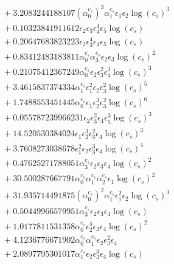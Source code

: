 \documentclass[10pt]{article}
\begin{document}
\begin{align*}
&{}  + 3.2083244188107 \left(\alpha_{0}^{c_s}\right)^{3} \alpha_{1}^{c_s} \epsilon_{1} \epsilon_{2} \log{\left(c_{s} \right)}^{3} \\
&{}  + 0.10323841911612 \epsilon_{2} \epsilon_{3} \epsilon_{4}^{4} \epsilon_{5} \log{\left(c_{s} \right)} \\
&{}  + 0.20647683823223 \epsilon_{2} \epsilon_{3}^{4} \epsilon_{4} \epsilon_{5} \log{\left(c_{s} \right)} \\
&{}  + 0.83412483183811 \alpha_{0}^{c_s} \alpha_{3}^{c_s} \epsilon_{2} \epsilon_{3} \log{\left(c_{s} \right)}^{2} \\
&{}  + 0.21075412367249 \alpha_{0}^{c_s} \epsilon_{2} \epsilon_{3}^{2} \epsilon_{4}^{3} \log{\left(c_{s} \right)}^{3} \\
&{}  + 3.4615837374334 \alpha_{1}^{c_s} \epsilon_{1}^{2} \epsilon_{2} \epsilon_{3}^{2} \log{\left(c_{s} \right)}^{5} \\
&{}  + 1.7488553451445 \alpha_{0}^{c_s} \epsilon_{1} \epsilon_{2}^{3} \epsilon_{3}^{2} \log{\left(c_{s} \right)}^{6} \\
&{}  + 0.055787239966231 \epsilon_{2} \epsilon_{3}^{2} \epsilon_{4} \epsilon_{5}^{3} \log{\left(c_{s} \right)}^{3} \\
&{}  + 14.520530384024 \epsilon_{1} \epsilon_{2}^{3} \epsilon_{3}^{2} \epsilon_{4} \log{\left(c_{s} \right)}^{3} \\
&{}  + 3.7608273038678 \epsilon_{1}^{2} \epsilon_{2} \epsilon_{3}^{3} \epsilon_{4} \log{\left(c_{s} \right)}^{4} \\
&{}  + 0.47625271788051 \alpha_{3}^{c_s} \epsilon_{2} \epsilon_{3} \epsilon_{4} \log{\left(c_{s} \right)}^{2} \\
&{}  + 30.500287667791 \alpha_{0}^{c_s} \alpha_{1}^{c_s} \alpha_{2}^{c_s} \epsilon_{1} \log{\left(c_{s} \right)}^{2} \\
&{}  + 31.935714491875 \left(\alpha_{0}^{c_s}\right)^{2} \alpha_{1}^{c_s} \epsilon_{1}^{2} \epsilon_{2} \log{\left(c_{s} \right)}^{3} \\
&{}  + 0.50449966579951 \alpha_{3}^{c_s} \epsilon_{2} \epsilon_{3} \epsilon_{4} \log{\left(c_{s} \right)} \\
&{}  + 1.0177811531358 \alpha_{0}^{c_s} \epsilon_{2}^{4} \epsilon_{3} \epsilon_{4} \log{\left(c_{s} \right)}^{2} \\
&{}  + 4.1236776671902 \alpha_{0}^{c_s} \alpha_{1}^{c_s} \epsilon_{2} \epsilon_{3}^{2} \epsilon_{4} \\
&{}  + 2.0897795301017 \alpha_{1}^{c_s} \epsilon_{2} \epsilon_{3}^{3} \epsilon_{4} \log{\left(c_{s} \right)} \\

\end{align*}
\end{document}
